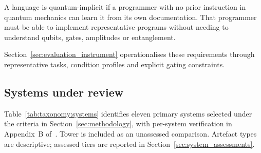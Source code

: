 \ifthesis
\begin{mdframed}[frametitle={Litmus test}]
    A language is quantum-implicit if a programmer with no prior instruction in quantum mechanics can learn it from its own documentation.
    That programmer must be able to implement representative programs without needing to understand qubits, gates, amplitudes or entanglement.
\end{mdframed}
\fi

Section~\ref{sec:evaluation_instrument} operationalises these requirements through representative tasks, condition profiles and explicit gating constraints.

\ifthesis

\subsection{Systems under review}\label{subsec:taxonomy:systems}
Table~\ref{tab:taxonomy:systems} identifies eleven primary systems selected under the criteria in Section~\ref{sec:methodology}, with per-system verification in Appendix~B of~\cite{kavadias2026qplSurveySupplementary}.
Tower is included as an unassessed comparison.
Artefact types are descriptive; assessed tiers are reported in Section~\ref{sec:system_assessments}.

